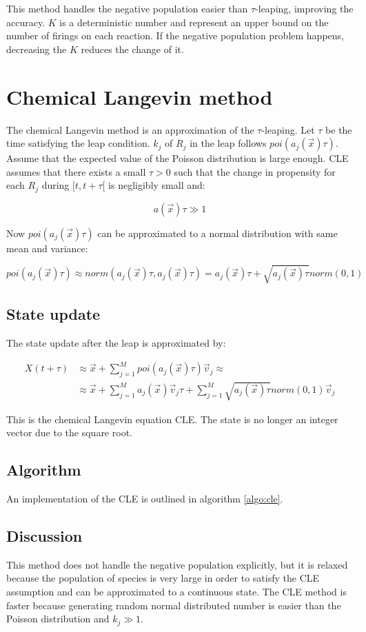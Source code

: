     This method handles the negative population easier than $\tau$-leaping, improving the accuracy.
    $K$ is a deterministic number and represent an upper bound on the number of firings on each reaction.
    If the negative population problem happens, decreasing the $K$ reduces the change of it.

\section{Chemical Langevin method}
The chemical Langevin method is an approximation of the $\tau$-leaping.
Let $\tau$ be the time satisfying the leap condition.
$k_j$ of $R_j$ in the leap follows $poi(a_j(\vec{x})\tau)$.
Assume that the expected value of the Poisson distribution is large enough.
CLE assumes that there exists a small $\tau>0$ such that the change in propensity for each $R_j$ during $[t,t+\tau[$ is negligibly small and:

$$a(\vec{x})\tau\gg 1$$

Now $poi(a_j(\vec{x})\tau)$ can be approximated to a normal distribution with same mean and variance:

$$poi(a_j(\vec{x})\tau)\approx norm(a_j(\vec{x})\tau, a_j(\vec{x})\tau) = a_j(\vec{x})\tau + \sqrt{a_j(\vec{x})\tau}norm(0,1)$$

  \subsection{State update}
  The state update after the leap is approximated by:

  \begin{align*}
    X(t+\tau)&\approx \vec{x} + \sum\limits_{j=1}^M poi(a_j(\vec{x})\tau)\vec{v}_j \approx\\
             &\approx \vec{x}+\sum\limits_{j=1}^Ma_j(\vec{x})\vec{v}_j\tau + \sum\limits_{j=1}^M\sqrt{a_j(\vec{x})\tau}norm(0,1)\vec{v}_j
  \end{align*}

  This is the chemical Langevin equation CLE.
  The state is no longer an integer vector due to the square root.

  \subsection{Algorithm}
  An implementation of the CLE is outlined in algorithm \ref{algo:cle}.

  

  \subsection{Discussion}
  This method does not handle the negative population explicitly, but it is relaxed because the population of species is very large in order to satisfy the CLE assumption and can be approximated to a continuous state.
  The CLE method is faster because generating random normal distributed number is easier than the Poisson distribution and $k_j\gg 1$.
